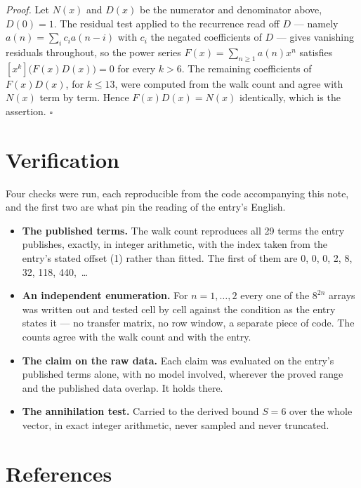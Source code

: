 \documentclass[11pt]{article}
\theoremstyle{definition}
\begin{document}
{\itshape Proof.} Let $N(x)$ and $D(x)$ be the numerator and denominator above, $D(0)=1$. The residual test applied to the recurrence read off $D$ --- namely $a(n) = \sum_i c_i a(n-i)$ with $c_i$ the negated coefficients of $D$ --- gives vanishing residuals throughout, so the power series $F(x)=\sum_{n\ge 1}a(n)x^n$ satisfies $[x^k]\bigl(F(x)D(x)\bigr) = 0$ for every $k > 6$. The remaining coefficients of $F(x)D(x)$, for $k \le 13$, were computed from the walk count and agree with $N(x)$ term by term. Hence $F(x)D(x) = N(x)$ identically, which is the assertion. $\square$

\section{Verification}

Four checks were run, each reproducible from the code accompanying this note, and the first two are what pin the reading of the entry's English.

\begin{itemize}

\item {\bfseries The published terms.} The walk count reproduces all 29 terms the entry publishes, exactly, in integer arithmetic, with the index taken from the entry's stated offset (1) rather than fitted. The first of them are 0, 0, 0, 2, 8, 32, 118, 440,~\dots

\item {\bfseries An independent enumeration.} For $n = 1,\dots,2$ every one of the $8^{2n}$ arrays was written out and tested cell by cell against the condition as the entry states it --- no transfer matrix, no row window, a separate piece of code. The counts agree with the walk count and with the entry.

\item {\bfseries The claim on the raw data.} Each claim was evaluated on the entry's published terms alone, with no model involved, wherever the proved range and the published data overlap. It holds there.

\item {\bfseries The annihilation test.} Carried to the derived bound $S = 6$ over the whole vector, in exact integer arithmetic, never sampled and never truncated.

\end{itemize}

\section{References}
\end{document}
